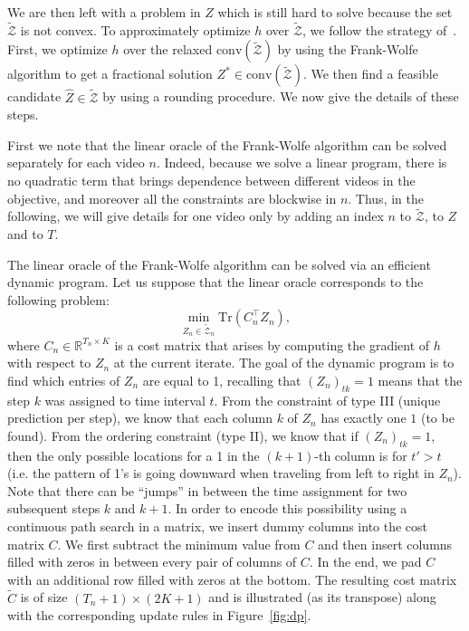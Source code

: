 \documentclass[10pt,twocolumn,letterpaper]{article}
\begin{document}
%
%
%
%
%
%

%
%
%

%
We are then left with a problem in $Z$ which is still hard to solve because the set $\tilde{\mathcal{Z}}$ is not convex. 
To approximately optimize $h$ over $\tilde{\mathcal{Z}}$, we follow the strategy of~\cite{Bojanowski14weakly,Bojanowski15weakly}.  First, we optimize $h$ over the relaxed $\text{conv}(\tilde{\mathcal{Z}})$ by using the Frank-Wolfe algorithm to get a fractional solution $Z^* \in \text{conv}(\tilde{\mathcal{Z}})$. We then find a feasible candidate $\hat{Z} \in \tilde{\mathcal{Z}}$ by using a rounding procedure. We now give the details of these steps.  

First we note that the linear oracle of the Frank-Wolfe algorithm can be solved separately for each video $n$.
Indeed, because we solve a linear program, there is no quadratic term that brings dependence between different videos in the objective, and moreover all the constraints are blockwise in $n$.
%
Thus, in the following, we will give details for one video only by adding an index $n$ to $\tilde{\mathcal{Z}}$, to $Z$ and to $T$.

The linear oracle of the Frank-Wolfe algorithm can be solved via an efficient dynamic program.
%
Let us suppose that the linear oracle corresponds to the following problem: 
\begin{equation}
    \min_{Z_n \in \tilde{\mathcal{Z}}_n} \text{Tr}(C_n^\top Z_n),
    \label{eq:linear}
\end{equation}
where $C_n \in \mathbb{R}^{T_n \times K}$ is a cost matrix that arises by computing the gradient of $h$ with respect to $Z_n$ at the current iterate. The goal of the dynamic program is to find which entries of $Z_n$ are equal to 1, recalling that $(Z_n)_{tk}=1$ means that the step $k$ was assigned to time interval $t$. From the constraint of type III (unique prediction per step), we know that each column $k$ of $Z_n$ has exactly one $1$ (to be found). From the ordering constraint (type II), we know that if $(Z_n)_{tk} = 1$, then the only possible locations for a 1 in the $(k+1)$-th column is for $t' > t$ (i.e. the pattern of 1's is going downward when traveling from left to right in $Z_n$). Note that there can be ``jumps'' in between the time assignment for two subsequent steps $k$ and $k+1$. In order to encode this possibility using a continuous path search in a matrix, we insert dummy columns into the cost matrix $C$.
We first subtract the minimum value from $C$ and then insert columns filled with zeros in between every pair of columns of $C$.
In the end, we pad $C$ with an additional row filled with zeros at the bottom.
The resulting cost matrix $\tilde{C}$ is of size $(T_n+1) \times (2K+1)$ and is illustrated (as its transpose) along with the corresponding update rules in Figure~\ref{fig:dp}.
\end{document}
